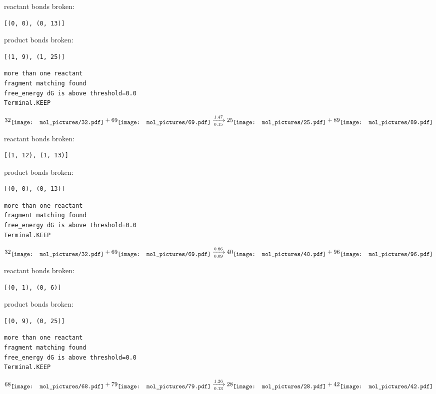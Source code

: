\documentclass{article}
\begin{document}
reactant bonds broken:\begin{verbatim}
[(0, 0), (0, 13)]
\end{verbatim}
product bonds broken:\begin{verbatim}
[(1, 9), (1, 25)]
\end{verbatim}




\vspace{1cm}
\begin{verbatim}
more than one reactant
fragment matching found
free_energy dG is above threshold=0.0
Terminal.KEEP
\end{verbatim}
$$
32
\raisebox{-.5\height}{\texttt{[image: mol\_pictures/32.pdf]}}
+
69
\raisebox{-.5\height}{\texttt{[image: mol\_pictures/69.pdf]}}
\xrightarrow[0.15]{1.47}
25
\raisebox{-.5\height}{\texttt{[image: mol\_pictures/25.pdf]}}
+
89
\raisebox{-.5\height}{\texttt{[image: mol\_pictures/89.pdf]}}
$$


reactant bonds broken:\begin{verbatim}
[(1, 12), (1, 13)]
\end{verbatim}
product bonds broken:\begin{verbatim}
[(0, 0), (0, 13)]
\end{verbatim}




\vspace{1cm}
\begin{verbatim}
more than one reactant
fragment matching found
free_energy dG is above threshold=0.0
Terminal.KEEP
\end{verbatim}
$$
32
\raisebox{-.5\height}{\texttt{[image: mol\_pictures/32.pdf]}}
+
69
\raisebox{-.5\height}{\texttt{[image: mol\_pictures/69.pdf]}}
\xrightarrow[0.09]{0.86}
40
\raisebox{-.5\height}{\texttt{[image: mol\_pictures/40.pdf]}}
+
96
\raisebox{-.5\height}{\texttt{[image: mol\_pictures/96.pdf]}}
$$


reactant bonds broken:\begin{verbatim}
[(0, 1), (0, 6)]
\end{verbatim}
product bonds broken:\begin{verbatim}
[(0, 9), (0, 25)]
\end{verbatim}




\vspace{1cm}
\begin{verbatim}
more than one reactant
fragment matching found
free_energy dG is above threshold=0.0
Terminal.KEEP
\end{verbatim}
$$
68
\raisebox{-.5\height}{\texttt{[image: mol\_pictures/68.pdf]}}
+
79
\raisebox{-.5\height}{\texttt{[image: mol\_pictures/79.pdf]}}
\xrightarrow[0.13]{1.26}
28
\raisebox{-.5\height}{\texttt{[image: mol\_pictures/28.pdf]}}
+
42
\raisebox{-.5\height}{\texttt{[image: mol\_pictures/42.pdf]}}
$$
\end{document}
